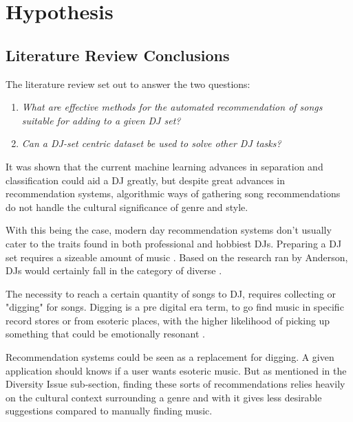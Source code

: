 
\graphicspath{{Chapter4/}}

\chapter{Hypothesis}

\section{Literature Review Conclusions}

The literature review set out to answer the two questions:
 
 \begin{enumerate}
 	\item \textit{What are effective methods for the automated recommendation of songs suitable for adding to a given DJ set?}
 	
 	\item \textit{Can a DJ-set centric dataset be used to solve other DJ tasks?}
	\end{enumerate}
 
 It was shown that the current machine learning advances in separation and classification could aid a DJ greatly, but despite great advances in recommendation systems, algorithmic ways of gathering song recommendations do not handle the cultural significance of genre and style.

With this being the case, modern day recommendation systems don't usually cater to the traits found in both professional and hobbiest DJs. Preparing a DJ set requires a sizeable amount of music \citep{allen_djs_2021}. Based on the research ran by Anderson, DJs would certainly fall in the category of diverse \citep{anderson_algorithmic_2020}.

The necessity to reach a certain quantity of songs to DJ, requires collecting or "digging" for songs. Digging is a pre digital era term, to go find music in specific record stores or from esoteric places, with the higher likelihood of picking up something that could be emotionally resonant \citep{allen_djs_2021}.

Recommendation systems could be seen as a replacement for digging. A given application should knows if a user wants esoteric music. But as mentioned in the Diversity Issue sub-section, finding these sorts of recommendations relies heavily on the cultural context surrounding a genre and with it gives less desirable suggestions compared to manually finding music. 

